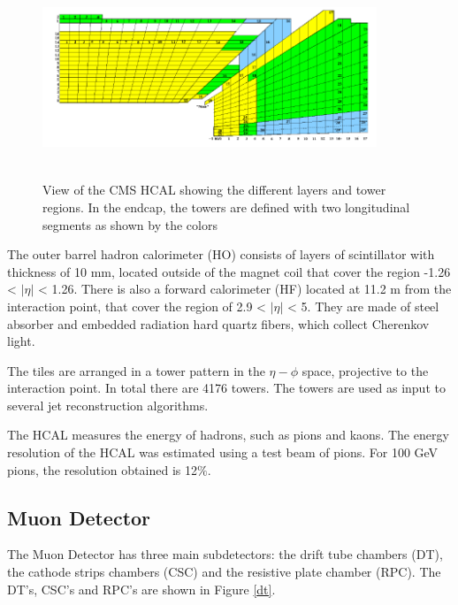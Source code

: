 \begin{figure}[ht]
	\centering
	\includegraphics[width=10cm,height=6cm]{Chapter2/hcal.png}
	\caption[View of the HCAL ]{View of the CMS HCAL showing the different layers and tower regions. In the endcap, the towers are defined with two longitudinal segments as shown by the colors\cite{cms-manual}}\label{hcal}
\end{figure}
The outer barrel hadron calorimeter (HO) consists of layers of scintillator with thickness of 10 mm, located outside of the
magnet coil that cover the region -1.26 < $|\eta|$ < 1.26.
There is also a forward calorimeter (HF) located at 11.2 m from the interaction point, that cover the region of 2.9 < $|\eta|$ < 5. They are made of
steel absorber and embedded radiation hard quartz fibers, which collect
Cherenkov light\cite{cms-manual}.%

The tiles are arranged in a tower pattern in the $\eta-\phi$ space, projective to the interaction point. In total there
are 4176 towers. The towers are used as input to several jet reconstruction algorithms.

The HCAL measures the energy of hadrons, such as pions and kaons. 
The energy resolution of the HCAL was estimated using a test beam of pions. For 100 GeV pions, the resolution obtained is 12$\%$.

\subsection{Muon Detector}
The Muon Detector has three main subdetectors: the drift tube chambers (DT), the cathode strips chambers (CSC) and the resistive plate chamber (RPC). 
The DT's, CSC's and RPC's are shown in Figure \ref{dt}.
 
